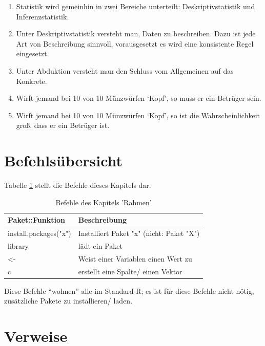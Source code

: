 \documentclass[12pt,ngerman,]{book}
\theoremstyle{definition}
\theoremstyle{definition}
\theoremstyle{remark}
\begin{document}
\begin{enumerate}
\def\labelenumi{\arabic{enumi}.}
\item
  Statistik wird gemeinhin in zwei Bereiche unterteilt:
  Deskriptivstatistik und Inferenzstatistik.
\item
  Unter Deskriptivstatistik versteht man, Daten zu beschreiben. Dazu ist
  jede Art von Beschreibung sinnvoll, vorausgesetzt es wird eine
  konsistente Regel eingesetzt.
\item
  Unter Abduktion versteht man den Schluss vom Allgemeinen auf das
  Konkrete.
\item
  Wirft jemand bei 10 von 10 Münzwürfen `Kopf', so muss er ein Betrüger
  sein.
\item
  Wirft jemand bei 10 von 10 Münzwürfen `Kopf', so ist die
  Wahrscheinlichkeit groß, dass er ein Betrüger ist.
\end{enumerate}

\section{Befehlsübersicht}\label{befehlsubersicht}

Tabelle \ref{tab:befehle-rahmen} stellt die Befehle dieses Kapitels dar.

\begin{table}

\caption{\label{tab:befehle-rahmen}Befehle des Kapitels 'Rahmen'}
\centering
\begin{tabular}[t]{l|l}
\hline
Paket::Funktion & Beschreibung\\
\hline
install.packages("x") & Installiert Paket "x" (nicht: Paket "X")\\
\hline
library & lädt ein Paket\\
\hline
<- & Weist einer Variablen einen Wert zu\\
\hline
c & erstellt eine Spalte/ einen Vektor\\
\hline
\end{tabular}
\end{table}

Diese Befehle ``wohnen'' alle im Standard-R; es ist für diese Befehle
nicht nötig, zusätzliche Pakete zu installieren/ laden.

\section{Verweise}\label{verweise}
\end{document}
